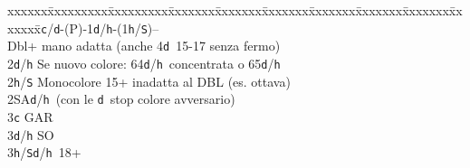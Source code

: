 \documentclass[a4paper,italian]{article}
\newcommand{\BS}{\small{\texttt{S}}}
\newcommand{\BC}{\small{\texttt{c}}}
\newcommand{\BD}{\small{\texttt{d}}}
\newcommand{\BH}{\small{\texttt{h}}}
\newenvironment{bidtable}
{\begin{tabbing}

    xxxxxx\=xxxxxxxxx\=xxxxxxxxx\=xxxxxxx\=xxxxxxx\=xxxxxxx\=xxxxxxx\=xxxxxxx\=xxxxxxx\=xxxxxxx\=\kill}
{\end{tabbing} }%
\begin{document}
\begin{multicols}{2}
\begin{tcolorbox}[colframe=azzurro,title={Sviluppi particolari, validi in situazioni analoghe}]
        \bigskip

        \begin{bidtable}
            1\BC/\BD-(P)-1\BD/\BH-(1\BH/\BS)--\+\\
            Dbl+ mano adatta (anche 4\BD\ 15-17 senza fermo)\\
            2\BD/\BH\> Se nuovo colore: 64\BD/\BH\ concentrata o 65\BD/\BH\\
            2\BH/\BS\> Monocolore 15+ inadatta al DBL (es. ottava)\\
            2\small{SA}\BD/\BH\ (con le \BD\ stop colore avversario)\+\\
            3\BC\> GAR\\
            3\BD/\BH\> SO\-\\
            3\BH/\BS{}\BD/\BH\ 18+
        \end{bidtable}

    \end{tcolorbox}
\end{multicols}
\end{document}
